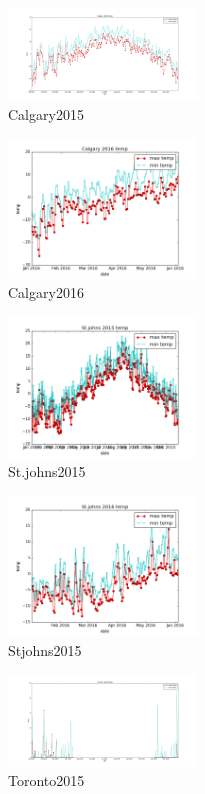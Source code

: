 \documentclass[DIV=calc, paper=a4, fontsize=11pt, twocolumn]{scrartcl}
\begin{document}
\begin{figure}[h!]
	\centering
	\includegraphics[width=50mm]{../output/plot_images/Calgary_2015.png}
	\caption{Calgary2015}
	\label{fig:method}
\end{figure}
\begin{figure}[h!]
	\centering
	\includegraphics[width=50mm]{../output/plot_images/Calgary_2016.png}
	\caption{Calgary2016}
	\label{fig:method2}
\end{figure}

\begin{figure}[h!]
	\centering
	\includegraphics[width=50mm]{../output/plot_images/St.johns_2015.png}
	\caption{St.johns2015}
	\label{fig:method3}
\end{figure}

\begin{figure}[h!]
	\centering
	\includegraphics[width=50mm]{../output/plot_images/Stjohns_2016.png}
	\caption{Stjohns2015}
	\label{fig:method4}
\end{figure}
\begin{figure}[h!]
	\centering
	\includegraphics[width=50mm]{../output/plot_images/Toronto_2015.png}
	\caption{Toronto2015}
	\label{fig:method5}
\end{figure}
\end{document}
